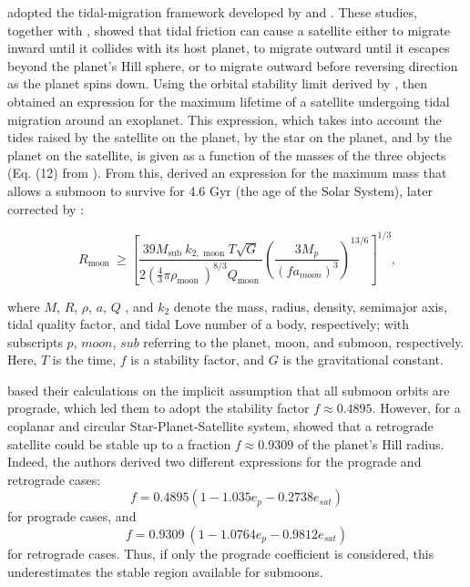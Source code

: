 \documentclass{aa}
\begin{document}
\cite{Kollmeier_2019} adopted the tidal-migration framework developed by \cite{Barnes_2002} and \cite{Sasaki_2012}. These studies, together with \cite{Piro_2018}, showed that tidal friction can cause a satellite either to migrate inward until it collides with its host planet, to migrate outward until it escapes beyond the planet's Hill sphere, or to migrate outward before reversing direction as the planet spins down. Using the orbital stability limit derived by \cite{Holman1999}, \cite{Barnes_2002} then obtained an expression for the maximum lifetime of a satellite undergoing tidal migration around an exoplanet. This expression, which takes into account the tides raised by the satellite on the planet, by the star on the planet, and by the planet on the satellite, is given as a function of the masses of the three objects (Eq. (12) from \cite{Barnes_2002}). From this, \cite{Kollmeier_2019} derived an expression for the maximum mass that allows a submoon to survive for 4.6 Gyr (the age of the Solar System), later corrected by \cite{Rosario-Franco_2020}:

\begin{equation}
R_{\text {moon }} \geq\left[\frac{39 M_{\text {sub }} k_{2, \text { moon }} T \sqrt{G}}{2\left(\frac{4}{3} \pi \rho_{\text {moon }}\right)^{8 / 3} Q_{\text {moon }}}\left(\frac{3 M_p}{(f a_{moon})^3}\right)^{13 / 6}\right]^{1 / 3}\text{,}
\end{equation}

where $M$, $R$, $\rho$, $a$, $Q$ , and $k_2$ denote the mass, radius, density, semimajor axis, tidal quality factor, and tidal Love number of a body, respectively; with subscripts $p$, $moon$, $sub$ referring to the planet, moon, and submoon, respectively. Here, $T$ is the time, $f$ is a stability factor, and $G$ is the gravitational constant.


\cite{Kollmeier_2019} based their calculations on the implicit assumption that all submoon orbits are prograde, which led them to adopt the stability factor $f \approx 0.4895$. However, 
for a coplanar and circular Star-Planet-Satellite system, \cite{Domingos_2006} showed that a retrograde satellite could be stable up to a fraction $f \approx 0.9309$ of the planet's Hill radius. Indeed, the authors derived two different expressions for the prograde and retrograde cases:
\begin{equation}
  f= 0.4895 (1-1.035e_p-0.2738e_{sat})  
\end{equation}
for prograde cases, and
\begin{equation} 
f= 0.9309\ (1-1.0764e_p-0.9812e_{sat}) 
\end{equation}
for retrograde cases. Thus, if only the prograde coefficient is considered, this underestimates the stable region available for submoons.
\end{document}
